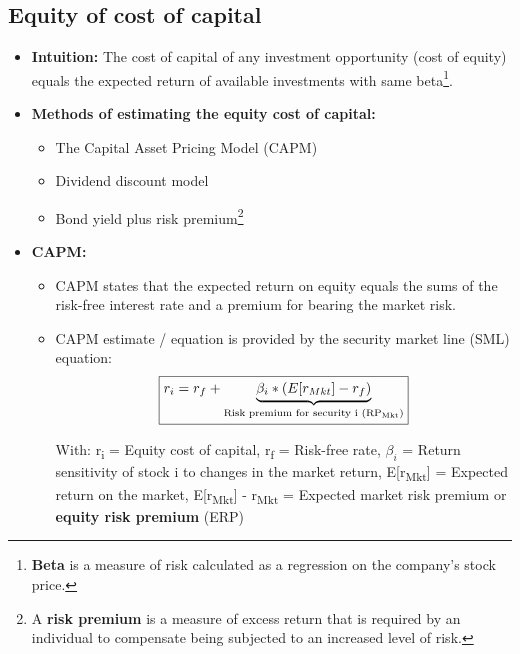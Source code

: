 \documentclass[ieeetran]{article}
\begin{document}
\subsection{Equity of cost of capital} %
\label{sub:equity_of_cost_of_capital}
\begin{itemize}
	\item \textbf{Intuition:} The cost of capital of any investment opportunity (cost of equity) equals the expected return of available investments with same beta\footnote{\textbf{Beta} is a measure of risk calculated as a regression on the company’s stock price.}.
	\item \textbf{Methods of estimating the equity cost of capital:}
		\begin{itemize}
		  \item The Capital Asset Pricing Model (CAPM)
		\item Dividend discount model
		\item Bond yield plus risk premium\footnote{A \textbf{risk premium} is a measure of excess return that is required by an individual to compensate being subjected to an increased level of risk.}
		\end{itemize}
\item \textbf{CAPM:}
	\begin{itemize}
	  \item CAPM states that the expected return on equity equals the sums of the risk-free interest rate and a premium for bearing the market risk.
	\item CAPM estimate / equation is provided by the security market line (SML) equation:
		\large
		\begin{equation*}
		\boxed{
		\begin{aligned}
			r_i = r_f + \underbrace{\beta_i * (E[r_{Mkt}] - r_f)}_\text{Risk premium for security i (RP\textsubscript{Mkt})} 
		\end{aligned}
		}
		\end{equation*}
		\normalsize

		With: r\textsubscript{i} = Equity cost of capital, r\textsubscript{f} = Risk-free rate,  $\beta_i$  = Return sensitivity of stock i to changes in the market return, E[r\textsubscript{Mkt}] = Expected return on the market, E[r\textsubscript{Mkt}] - r\textsubscript{Mkt} = Expected market risk premium or \textbf{equity risk premium} (ERP) 
	

\end{itemize}
\end{itemize}
\end{document}
